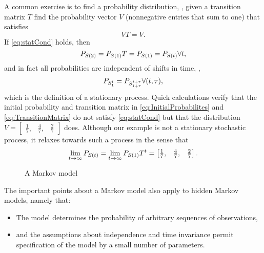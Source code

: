 A common exercise is to find a \emph{} probability
distribution, \ie, given a transition matrix $T$ find the probability
vector $V$ (nonnegative entries that sum to one) that satisfies
\begin{equation}
  \label{eq:statCond}
  VT = V.  
\end{equation}
If \eqref{eq:statCond} holds, then
\begin{equation*}
  P_{{S}{(2)}}  = P_{{S}{(1)}}T = P_{{S}{(1)}} = P_{{S}{(t)}}
  \forall t,
\end{equation*}
and in fact all probabilities are independent of shifts in time, \ie,
\begin{equation*}
  P_{S_{1}^{t}} = P_{S_{1+\tau}^{t+\tau}} \forall (t,\tau),
\end{equation*}
which is the definition of a stationary process.  Quick calculations
verify that the initial probability and transition matrix in
\eqref{eq:InitialProbabilites} and \eqref{eq:TransitionMatrix} do not
satisfy \eqref{eq:statCond} but that the distribution $V =
\begin{bmatrix} \frac{1}{7}, & \frac{4}{7}, & \frac{2}{7}
\end{bmatrix}$ does.  Although our example is not a stationary
stochastic process, it relaxes towards such a process in the sense
that
\begin{equation*}
  \lim_{t \rightarrow \infty} P_{{S}{(t)}} =  \lim_{t \rightarrow
    \infty} P_{{S}{(1)}} T^t = \begin{bmatrix} \frac{1}{7}, & \frac{4}{7}, & \frac{2}{7}
\end{bmatrix}.
\end{equation*}

\begin{figure}[htbp]
  \centering{\plotsize%
    }
  \caption[A Markov model.]{A Markov model}
  \label{fig:mm}
\end{figure}

The important points about a Markov model also apply to hidden
Markov models, namely that:
\begin{itemize}
\item The model determines the probability of arbitrary sequences of
  observations,
\item and the assumptions about independence and time invariance
  permit specification of the model by a small number of parameters.
\end{itemize}

